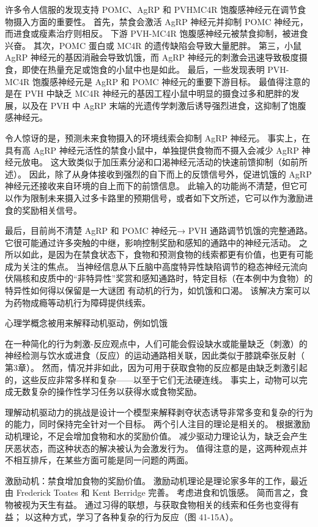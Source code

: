 许多令人信服的发现支持 POMC、AgRP 和 PVHMC4R 饱腹感神经元在调节食物摄入方面的重要性。 首先，禁食会激活 AgRP 神经元并抑制 POMC 神经元，而进食或瘦素治疗则相反。 下游 PVH-MC4R 饱腹感神经元被禁食抑制，被进食兴奋。 其次，POMC 蛋白或 MC4R 的遗传缺陷会导致大量肥胖。 第三，小鼠 AgRP 神经元的基因消融会导致饥饿，而 AgRP 神经元的刺激会迅速导致极度摄食，即使在热量充足或饱食的小鼠中也是如此。 最后，一些发现表明 PVH-MC4R 饱腹感神经元是 AgRP 和 POMC 神经元的重要下游目标。 最值得注意的是在 PVH 中缺乏 MC4R 神经元的基因工程小鼠中明显的摄食过多和肥胖的发展，以及在 PVH 中 AgRP 末端的光遗传学刺激后诱导强烈进食，这抑制了饱腹感神经元。

令人惊讶的是，预测未来食物摄入的环境线索会抑制 AgRP 神经元。 事实上，在具有高 AgRP 神经元活性的禁食小鼠中，单独提供食物而不摄入会减少 AgRP 神经元放电。 这大致类似于加压素分泌和口渴神经元活动的快速前馈抑制（如前所述）。 因此，除了从身体接收到强烈的自下而上的反馈信号外，促进饥饿的 AgRP 神经元还接收来自环境的自上而下的前馈信息。 此输入的功能尚不清楚，但它可以作为限制未来摄入过多卡路里的预期信号，或者如下文所述，它可以作为激励进食的奖励相关信号。

最后，目前尚不清楚 AgRP 和 POMC 神经元→ PVH 通路调节饥饿的完整通路。 它很可能通过许多突触的中继，影响控制奖励和感知的通路中的神经元活动。 之所以如此，是因为在禁食状态下，食物和预测食物的线索都更有价值，也更有可能成为关注的焦点。 当神经信息从下丘脑中高度特异性缺陷调节的稳态神经元流向伏隔核和皮质中的“非特异性”奖赏和感知通路时，特定目标（在本例中为食物）的特异性如何得以保留是一大谜团 有动机的行为，如饥饿和口渴。 该解决方案可以为药物成瘾等动机行为障碍提供线索。

心理学概念被用来解释动机驱动，例如饥饿

在一种简化的行为刺激-反应观点中，人们可能会假设缺水或能量缺乏（刺激）的神经检测与饮水或进食（反应）的运动通路相关联，因此类似于膝跳牵张反射（ 第3章）。 然而，情况并非如此，因为可用于获取食物的反应都是由缺乏刺激引起的，这些反应非常多样和复杂——以至于它们无法硬连线。 事实上，动物可以完成无数复杂的操作性学习任务以获得水或食物奖励。

理解动机驱动力的挑战是设计一个模型来解释剥夺状态诱导非常多变和复杂的行为的能力，同时保持完全针对一个目标。 两个引人注目的理论是相关的。 根据激励动机理论，不足会增加食物和水的奖励价值。 减少驱动力理论认为，缺乏会产生厌恶状态，而这种状态的解决被认为会激发行为。 值得注意的是，这两种观点并不相互排斥，在某些方面可能是同一问题的两面。

激励动机：禁食增加食物的奖励价值。 激励动机理论是理论家多年的工作，最近由 Frederick Toates 和 Kent Berridge 完善。 考虑进食和饥饿感。 简而言之，食物被视为天生有益。 通过习得的联想，与获取食物相关的线索和任务也变得有益； 以这种方式，学习了各种复杂的行为反应（图 41-15A）。


